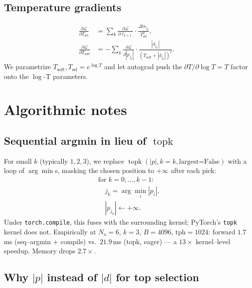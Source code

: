 \documentclass[11pt]{article}
\newcommand{\NAP}{N_{\!\text{a}}}
\newcommand{\nalt}{k}
\newcommand{\bts}{\mathrm{ts}}
\newcommand{\Tsoft}{T_{\!\text{soft}}}
\newcommand{\Tsel}{T_{\!\text{sel}}}
\begin{document}
\subsection{Temperature gradients}

\begin{align}
  \frac{\partial \mathcal{L}}{\partial \Tsel}
  &= \sum_k \frac{\partial \mathcal{L}}{\partial \ell_{k+1}} \cdot
     \frac{\Delta \bts_{j_k}}{\Tsel^2}, \\
  \frac{\partial \mathcal{L}}{\partial \Tsoft}
  &= -\sum_k \frac{\partial \mathcal{L}}{\partial |p_{j_k}|} \cdot
     \frac{|d_{j_k}|}{(\Tsoft + |d_{j_k}|)^2}.
\end{align}
We parametrize $\Tsoft, \Tsel = e^{\log T}$ and let autograd push the
$\partial T / \partial \log T = T$ factor onto the $\log$-T parameters.

\section{Algorithmic notes}

\subsection{Sequential argmin in lieu of $\operatorname{topk}$}

For small $\nalt$ (typically $1, 2, 3$), we replace
$\operatorname{topk}(|p|, k=\nalt, \text{largest=False})$ with a loop of
$\arg\min{}$s, masking the chosen position to $+\infty$ after each pick:
\begin{equation}
  \begin{aligned}
  &\text{for } k = 0, \dots, \nalt{-}1: \\
  &\quad j_k = \arg\min_i |p_i|, \\
  &\quad |p_{j_k}| \leftarrow +\infty.
  \end{aligned}
\end{equation}
Under \texttt{torch.compile}, this fuses with the surrounding kernel; PyTorch's
\texttt{topk} kernel does not. Empirically at $\NAP{=}6$, $\nalt{=}3$,
$B{=}4096$, $\text{tph}{=}1024$: forward $1.7$\,ms (seq--argmin + compile) vs.\
$21.9$\,ms (topk, eager) --- a $13\times$ kernel--level speedup. Memory drops
$2.7\times$.

\subsection{Why $|p|$ instead of $|d|$ for top selection}
\end{document}

